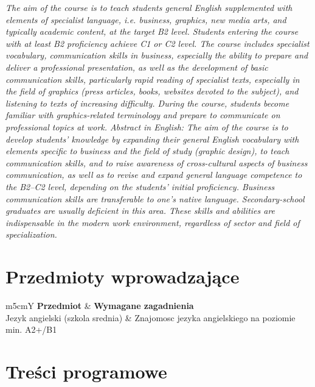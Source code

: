 \documentclass[12pt, a4paper]{article}
\newcommand{\thdrule}{\noalign{\global\setlength{\extrarowheight}{0pt}}}
\newcommand{\thdend}{\noalign{\global\setlength{\extrarowheight}{3pt}}}
\begin{document}
\textit{The aim of the course is to teach students general English supplemented with elements of specialist language, i.e. business, graphics, new media arts, and typically academic content, at the target B2 level. Students entering the course with at least B2 proficiency achieve C1 or C2 level. The course includes specialist vocabulary, communication skills in business, especially the ability to prepare and deliver a professional presentation, as well as the development of basic communication skills, particularly rapid reading of specialist texts, especially in the field of graphics (press articles, books, websites devoted to the subject), and listening to texts of increasing difficulty. During the course, students become familiar with graphics-related terminology and prepare to communicate on professional topics at work. Abstract in English: The aim of the course is to develop students’ knowledge by expanding their general English vocabulary with elements specific to business and the field of study (graphic design), to teach communication skills, and to raise awareness of cross-cultural aspects of business communication, as well as to revise and expand general language competence to the B2–C2 level, depending on the students’ initial proficiency. Business communication skills are transferable to one’s native language. Secondary-school graduates are usually deficient in this area. These skills and abilities are indispensable in the modern work environment, regardless of sector and field of specialization.}


\section{Przedmioty wprowadzające}

{\scriptsize
\begin{tabularx}{\textwidth}{m{5cm}Y}
\thdrule\toprule
{} {\color{white}\textbf{Przedmiot}} & {\color{white}\textbf{Wymagane zagadnienia}} \\
\midrule\thdend
   Jezyk angielski (szkola srednia) & Znajomosc jezyka angielskiego na poziomie min. A2+/B1 \\
\bottomrule
\end{tabularx}}

\section{Treści programowe}
\end{document}
